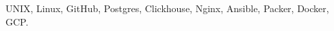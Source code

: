 \item[Technologies:] UNIX, Linux, GitHub, Postgres, Clickhouse, Nginx, Ansible,
Packer, Docker, GCP.